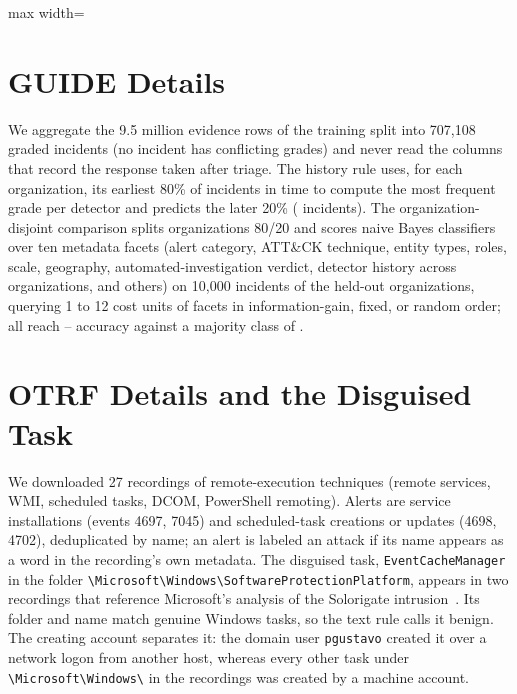 \begin{table}[h]
  \caption{Reported release: per-model Spearman correlation over the eight incidents between the reported reward and the share of named questions, with the reported mean reward (\%).}
  \label{tab:h3}
  \centering\scriptsize
  \begin{adjustbox}{max width=\columnwidth}\end{adjustbox}
\end{table}

\section{GUIDE Details}
\label{app:guide}

We aggregate the 9.5 million evidence rows of the training split into 707{,}108 graded incidents (no incident has conflicting grades) and never read the columns that record the response taken after triage. The history rule uses, for each organization, its earliest 80\% of incidents in time to compute the most frequent grade per detector and predicts the later 20\% (\gDev{} incidents). The organization-disjoint comparison splits organizations 80/20 and scores naive Bayes classifiers over ten metadata facets (alert category, ATT\&CK technique, entity types, roles, scale, geography, automated-investigation verdict, detector history across organizations, and others) on 10{,}000 incidents of the held-out organizations, querying 1 to 12 cost units of facets in information-gain, fixed, or random order; all reach \gHeldMin--\gHeldMax{} accuracy against a majority class of \gHeldMajority.

\section{OTRF Details and the Disguised Task}
\label{app:otrf}

We downloaded 27 recordings of remote-execution techniques (remote services, WMI, scheduled tasks, DCOM, PowerShell remoting). Alerts are service installations (events 4697, 7045) and scheduled-task creations or updates (4698, 4702), deduplicated by name; an alert is labeled an attack if its name appears as a word in the recording's own metadata. The disguised task, \texttt{EventCacheManager} in the folder \texttt{\textbackslash Microsoft\textbackslash Windows\textbackslash Software\-Protection\-Platform}, appears in two recordings that reference Microsoft's analysis of the Solorigate intrusion~\citep{solorigate}. Its folder and name match genuine Windows tasks, so the text rule calls it benign. The creating account separates it: the domain user \texttt{pgustavo} created it over a network logon from another host, whereas every other task under \texttt{\textbackslash Microsoft\textbackslash Windows\textbackslash} in the recordings was created by a machine account.


